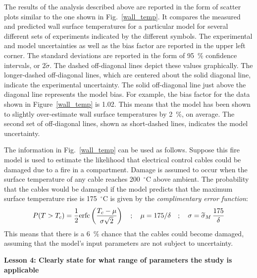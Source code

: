 \documentclass[fleqn,b5paper]{article}
\begin{document}
The results of the analysis described above are reported in the form of scatter plots similar to the one shown in Fig.~\ref{wall_temp}. It compares the measured and predicted wall surface temperatures for a particular model for several different sets of experiments indicated by the different symbols. The experimental and model uncertainties as well as the bias factor are reported in the upper left corner. The standard deviations are reported in the form of 95~\% confidence intervals, or $2\widetilde{\sigma}$. The dashed off-diagonal lines depict these values graphically. The longer-dashed off-diagonal lines, which are centered about the solid diagonal line, indicate the experimental uncertainty.  The solid off-diagonal line just above the diagonal line represents the model bias. For example, the bias factor for the data shown in Figure~\ref{wall_temp} is 1.02. This means that the model has been shown to slightly over-estimate wall surface temperatures by 2~\%, on average. The second set of off-diagonal lines, shown as short-dashed lines, indicates the model uncertainty. 

The information in Fig.~\ref{wall_temp} can be used as follows. Suppose this fire model is used to estimate the likelihood that electrical control cables could be damaged due to a fire in a compartment. Damage is assumed to occur when the surface temperature of any cable reaches 200~$^\circ$C above ambient. The probability that the cables would be damaged if the model predicts that the maximum surface temperature rise is 175~$^\circ$C is given by the {\em complimentary error function}:
\begin{equation}
   P(T>T_c) = \frac{1}{2} \hbox{erfc} \left( \frac{T_c - \mu}{\sigma \sqrt{2}} \right) \quad ; \quad \mu=175/\delta \quad ; \quad \sigma = \widetilde{\sigma}_M \, \frac{175}{\delta}
\end{equation}
This means that there is a 6~\% chance that the cables could become damaged, assuming that the model's input parameters are not
subject to uncertainty.


\vspace{\parskip}
{\bf Lesson 4: Clearly state for what range of parameters the study is applicable}
\end{document}
